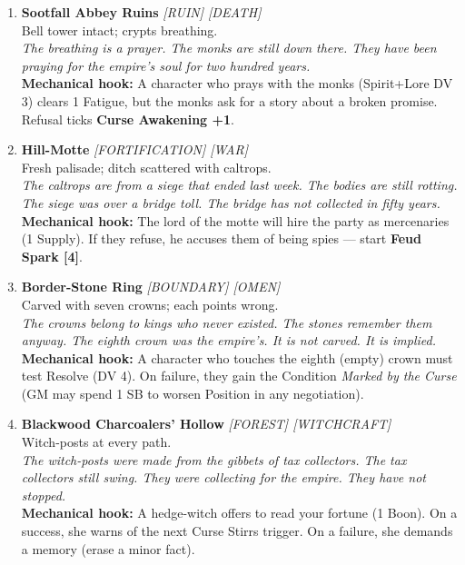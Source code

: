 \begin{enumerate}
\item \textbf{Sootfall Abbey Ruins} \hfill {} \textit{[RUIN] [DEATH]} \\
  Bell tower intact; crypts breathing. \\
  \textit{The breathing is a prayer. The monks are still down there. They have been praying for the empire's soul for two hundred years.} \\
  \textbf{Mechanical hook:} A character who prays with the monks (Spirit+Lore DV 3) clears 1 Fatigue, but the monks ask for a story about a broken promise. Refusal ticks \textbf{Curse Awakening +1}.

\item \textbf{Hill-Motte} \hfill {} \textit{[FORTIFICATION] [WAR]} \\
  Fresh palisade; ditch scattered with caltrops. \\
  \textit{The caltrops are from a siege that ended last week. The bodies are still rotting. The siege was over a bridge toll. The bridge has not collected in fifty years.} \\
  \textbf{Mechanical hook:} The lord of the motte will hire the party as mercenaries (1 Supply). If they refuse, he accuses them of being spies --- start \textbf{Feud Spark [4]}.

\item \textbf{Border-Stone Ring} \hfill {} \textit{[BOUNDARY] [OMEN]} \\
  Carved with seven crowns; each points wrong. \\
  \textit{The crowns belong to kings who never existed. The stones remember them anyway. The eighth crown was the empire's. It is not carved. It is implied.} \\
  \textbf{Mechanical hook:} A character who touches the eighth (empty) crown must test Resolve (DV 4). On failure, they gain the Condition \textit{Marked by the Curse} (GM may spend 1 SB to worsen Position in any negotiation).

\item \textbf{Blackwood Charcoalers' Hollow} \hfill {} \textit{[FOREST] [WITCHCRAFT]} \\
  Witch-posts at every path. \\
  \textit{The witch-posts were made from the gibbets of tax collectors. The tax collectors still swing. They were collecting for the empire. They have not stopped.} \\
  \textbf{Mechanical hook:} A hedge-witch offers to read your fortune (1 Boon). On a success, she warns of the next Curse Stirrs trigger. On a failure, she demands a memory (erase a minor fact).


\end{enumerate}

